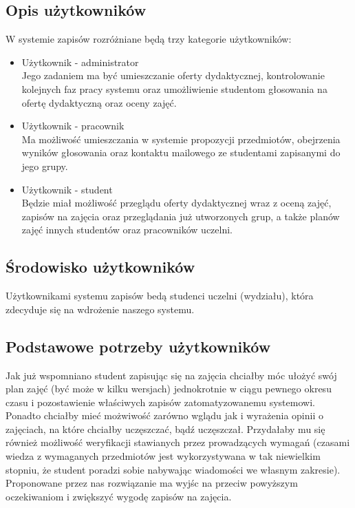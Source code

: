 \documentclass[11pt,leqno]{article}
\begin{document}
\subsection{Opis użytkowników}
W systemie zapisów rozróżniane będą trzy kategorie użytkowników:
\begin{itemize}
\item Użytkownik - administrator \\
Jego zadaniem ma być umieszczanie oferty dydaktycznej, kontrolowanie kolejnych faz pracy systemu oraz umożliwienie studentom głosowania na ofertę dydaktyczną oraz oceny zajęć. \\
\item Użytkownik - pracownik \\
Ma możliwość umieszczania w systemie propozycji przedmiotów, obejrzenia wyników głosowania oraz kontaktu mailowego ze studentami zapisanymi do jego grupy.
\item Użytkownik - student \\
Będzie miał możliwość przeglądu oferty dydaktycznej wraz z oceną zajęć, zapisów na zajęcia oraz przeglądania już utworzonych grup, a także planów zajęć innych studentów oraz pracowników uczelni.\\
\end{itemize}

\subsection{Środowisko użytkowników}
Użytkownikami systemu zapisów bedą studenci uczelni (wydziału), która zdecyduje się na wdrożenie naszego systemu.

\subsection{Podstawowe potrzeby użytkowników}
Jak już wspomniano student zapisując się na zajęcia chciałby móc ułożyć swój plan zajęć (być może w kilku wersjach) jednokrotnie w ciągu pewnego okresu czasu i pozostawienie właściwych zapisów zatomatyzowanemu systemowi. Ponadto chciałby mieć możwiwość zarówno wglądu jak i wyrażenia opinii o zajęciach, na które chciałby uczęszczać, bądź uczęszczał. Przydałaby mu się również możliwość weryfikacji stawianych przez prowadzących wymagań (czasami wiedza z wymaganych przedmiotów jest wykorzystywana w tak niewielkim stopniu, że student poradzi sobie nabywając wiadomości we własnym zakresie). \\
Proponowane przez nas rozwiązanie ma wyjśc na przeciw powyższym oczekiwaniom i zwiększyć wygodę zapisów na zajęcia.
\end{document}

